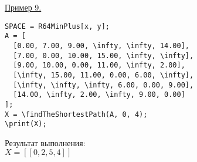 \underline{Пример 9. }

\vspace*{-3mm}
\begin{verbatim}
SPACE = R64MinPlus[x, y];
A = [
  [0.00, 7.00, 9.00, \infty, \infty, 14.00],
  [7.00, 0.00, 10.00, 15.00, \infty, \infty],
  [9.00, 10.00, 0.00, 11.00, \infty, 2.00],
  [\infty, 15.00, 11.00, 0.00, 6.00, \infty],
  [\infty, \infty, \infty, 6.00, 0.00, 9.00],
  [14.00, \infty, 2.00, \infty, 9.00, 0.00]
];
X = \findTheShortestPath(A, 0, 4);
\print(X);
\end{verbatim}

Результат выполнения:\\
$X=[[0, 2, 5, 4]]$
 

